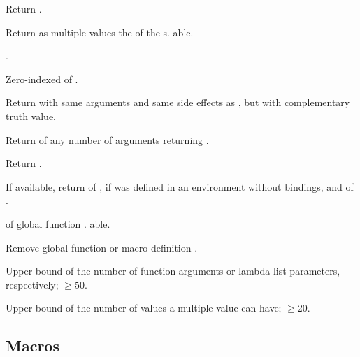 \begin{LIST}{1cm}
  {
    Return .
  }

  {
  Return as multiple values the  of the
  s. able. 
  }

  {
    .
  }

  {
  Zero-indexed  of .
  }

  {
  Return  with same arguments and same side effects
  as , but with complementary truth value.
  }

  {
  Return  of any number of arguments returning .
  }

  {
  Return .
  }

  {
  If available, return  of ,
  \retvalii{\NIL} if  was defined in an environment
  without bindings, and  of . 
  }

  {
   of global function . able.
  }

  {
  Remove global function or macro definition .
  }

  {
  Upper bound of the number of function arguments or lambda list
  parameters, respectively; $\geq50$. 
  }

  {
  Upper bound of the number of values a multiple value can have;
  $\geq20$. 
  }

\end{LIST}


\subsection{Macros}
\label{section:Macros}

